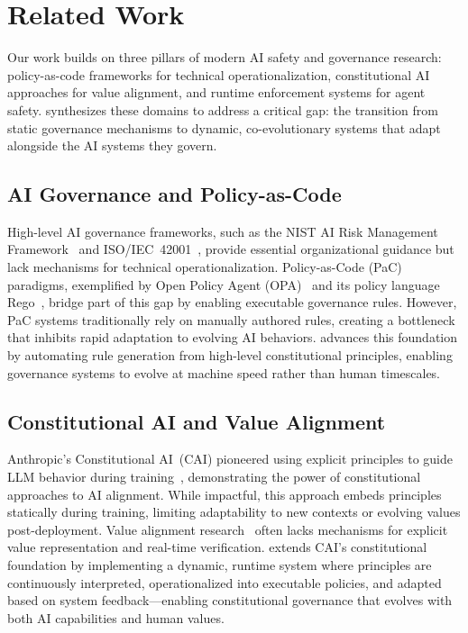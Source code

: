 \section{Related Work}\label{sec:related_work}
Our work builds on three pillars of modern AI safety and governance research: policy-as-code frameworks for technical operationalization, constitutional AI approaches for value alignment, and runtime enforcement systems for agent safety. \acgs{} synthesizes these domains to address a critical gap: the transition from static governance mechanisms to dynamic, co-evolutionary systems that adapt alongside the AI systems they govern.

\subsection{AI Governance and Policy-as-Code}
High-level AI governance frameworks, such as the NIST AI Risk Management Framework~\cite{nist2023ai} and ISO/IEC~42001~\cite{iso42001}, provide essential organizational guidance but lack mechanisms for technical operationalization. Policy-as-Code (PaC) paradigms, exemplified by Open Policy Agent (OPA)~\cite{opa2023} and its policy language Rego~\cite{rego2019}, bridge part of this gap by enabling executable governance rules. However, PaC systems traditionally rely on manually authored rules, creating a bottleneck that inhibits rapid adaptation to evolving AI behaviors. \acgs{} advances this foundation by automating rule generation from high-level constitutional principles, enabling governance systems to evolve at machine speed rather than human timescales.

\subsection{Constitutional AI and Value Alignment}
Anthropic's Constitutional AI~(CAI) pioneered using explicit principles to guide LLM behavior during training~\cite{anthropic2022constitutional}, demonstrating the power of constitutional approaches to AI alignment. While impactful, this approach embeds principles statically during training, limiting adaptability to new contexts or evolving values post-deployment. Value alignment research~\cite{russell2019human} often lacks mechanisms for explicit value representation and real-time verification. \acgs{} extends CAI's constitutional foundation by implementing a dynamic, runtime system where principles are continuously interpreted, operationalized into executable policies, and adapted based on system feedback—enabling constitutional governance that evolves with both AI capabilities and human values.

